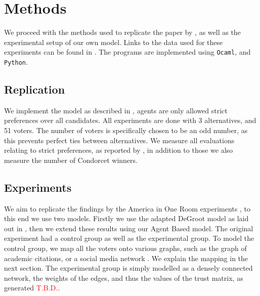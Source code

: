 \chapter{Methods}
\label{Methods}

We proceed with the methods used to replicate the paper by \citet{radDeliberationSinglePeakednessCoherent2021}, as well as the experimental setup of our own model. Links to the data used for these experiments can be found in . The programs are implemented using \texttt{Ocaml}, and \texttt{Python}.


\section{Replication}
We implement the model as described in , agents are only allowed strict preferences over all candidates. All experiments are done with 3 alternatives, and 51 voters. The number of voters is specifically chosen to be an odd number, as this prevents perfect ties between alternatives. We measure all evaluations relating to strict preferences, as reported by \citet{radDeliberationSinglePeakednessCoherent2021}, in addition to those we also measure the number of Condorcet winners. 

\section{Experiments}
We aim to replicate the findings by the America in One Room experiments \cite{fishkinCanDeliberationHave2024}, to this end we use two models. Firstly we use the adapted DeGroot model as laid out in , then we extend these results using our Agent Based model. The original experiment had a control group as well as the experimental group. To model the control group, we map all the voters onto various graphs, such as the graph of academic citations, or a social media network \cite{nr}. We explain the mapping in the next section. The experimental group is simply modelled as a densely connected network, the weights of the edges, and thus the values of the trust matrix, as generated \textcolor{red}{T.B.D.}. 

